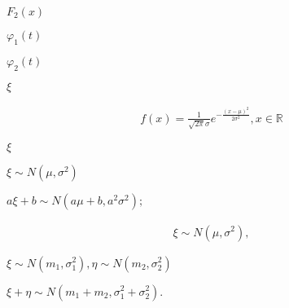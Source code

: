 \begin{preview}
\setcounter{equation}{0}%
\(F_2(x)\)
\end{preview}

\begin{preview}
\setcounter{equation}{0}%
\(\varphi_1(t)\)
\end{preview}

\begin{preview}
\setcounter{equation}{0}%
\(\varphi_2(t)\)
\end{preview}

\begin{preview}
\setcounter{equation}{0}%
\(\xi\)
\end{preview}

\begin{preview}
\setcounter{equation}{0}%
\begin{align}
  f(x) = \frac{1}{\sqrt{2\pi} \sigma}e^{-\frac{(x-\mu)^2}{2\sigma^2}},x \in \mathbb{R}
\end{align}

\end{preview}

\begin{preview}
\setcounter{equation}{0}%
\(\xi\)
\end{preview}

\begin{preview}
\setcounter{equation}{0}%
\(\xi \sim N(\mu, \sigma^2)\)
\end{preview}

\begin{preview}
\setcounter{equation}{0}%
\(a \xi + b \sim N(a\mu + b, a^2 \sigma^2);\)
\end{preview}

\begin{preview}
\setcounter{equation}{0}%
   \begin{align}
   \xi \sim N(\mu, \sigma^2),
   \end{align}

\end{preview}

\begin{preview}
\setcounter{equation}{0}%
\(\xi \sim N(m_1, \sigma_1^2), \eta \sim N(m_2, \sigma_2^2)\)
\end{preview}

\begin{preview}
\setcounter{equation}{0}%
\( \xi + \eta \sim N(m_1 + m_2, \sigma_1^2 + \sigma_2^2).\)
\end{preview}

